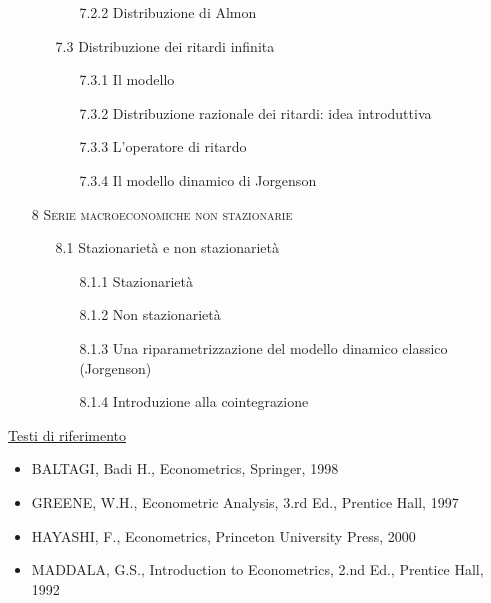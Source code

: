 \documentclass[a4paper,12pt]{article}
\begin{document}
\begin{enumerate}
\begin{enumerate}
\begin{enumerate}
\item[7.2.2] Distribuzione di Almon
\end{enumerate}

\item[7.3] Distribuzione dei ritardi infinita

\begin{enumerate}
\item[7.3.1] Il modello

\item[7.3.2] Distribuzione razionale dei ritardi: idea introduttiva

\item[7.3.3] L'operatore di ritardo

\item[7.3.4] Il modello dinamico di Jorgenson\newpage
\end{enumerate}
\end{enumerate}

\item[8] {\large \textsc{Serie macroeconomiche non stazionarie}}

\begin{enumerate}
\item[8.1] Stazionariet\`{a} e non stazionariet\`{a}

\begin{enumerate}
\item[8.1.1] Stazionariet\`{a}

\item[8.1.2] Non stazionariet\`{a}

\item[8.1.3] Una riparametrizzazione del modello dinamico classico
(Jorgenson)

\item[8.1.4] Introduzione alla cointegrazione
\end{enumerate}
\end{enumerate}
\end{enumerate}

\vspace{1.5cm}

\underline{Testi di riferimento}

\begin{itemize}
\item BALTAGI, Badi H., Econometrics, Springer, 1998

\item GREENE, W.H., Econometric Analysis, 3.rd Ed., Prentice Hall, 1997

\item HAYASHI, F., Econometrics, Princeton University Press, 2000

\item MADDALA, G.S., Introduction to Econometrics, 2.nd Ed., Prentice Hall,
1992
\end{itemize}
\end{document}
